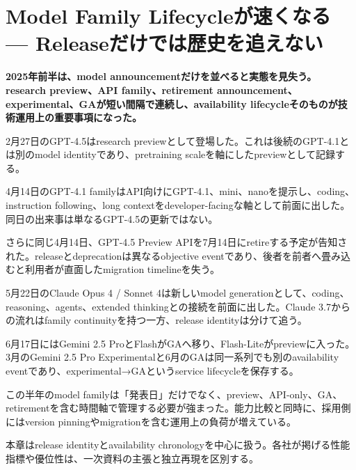 \section{Model Family Lifecycleが速くなる — Releaseだけでは歴史を追えない}
\noindent\textbf{2025年前半は、model announcementだけを並べると実態を見失う。research preview、API family、retirement announcement、experimental、GAが短い間隔で連続し、availability lifecycleそのものが技術運用上の重要事項になった。}\autocite{src-31799a46d8d0,src-3fa7f4cd510b,src-53f15d483a2d}

2月27日のGPT-4.5はresearch previewとして登場した。これは後続のGPT-4.1とは別のmodel identityであり、pretraining scaleを軸にしたpreviewとして記録する。\autocite{src-3fa7f4cd510b}


4月14日のGPT-4.1 familyはAPI向けにGPT-4.1、mini、nanoを提示し、coding、instruction following、long contextをdeveloper-facingな軸として前面に出した。同日の出来事は単なるGPT-4.5の更新ではない。\autocite{src-31799a46d8d0}


さらに同じ4月14日、GPT-4.5 Preview APIを7月14日にretireする予定が告知された。releaseとdeprecationは異なるobjective eventであり、後者を前者へ畳み込むと利用者が直面したmigration timelineを失う。\autocite{src-31799a46d8d0}


5月22日のClaude Opus 4 / Sonnet 4は新しいmodel generationとして、coding、reasoning、agents、extended thinkingとの接続を前面に出した。Claude 3.7からの流れはfamily continuityを持つ一方、release identityは分けて追う。\autocite{src-4ec03078d316}


6月17日にはGemini 2.5 ProとFlashがGAへ移り、Flash-Liteがpreviewに入った。3月のGemini 2.5 Pro Experimentalと6月のGAは同一系列でも別のavailability eventであり、experimental→GAというservice lifecycleを保存する。\autocite{src-53f15d483a2d}


この半年のmodel familyは「発表日」だけでなく、preview、API-only、GA、retirementを含む時間軸で管理する必要が強まった。能力比較と同時に、採用側にはversion pinningやmigrationを含む運用上の負荷が増えている。\autocite{src-31799a46d8d0,src-53f15d483a2d}


\begin{claimboundary}
本章はrelease identityとavailability chronologyを中心に扱う。各社が掲げる性能指標や優位性は、一次資料の主張と独立再現を区別する。
\end{claimboundary}
